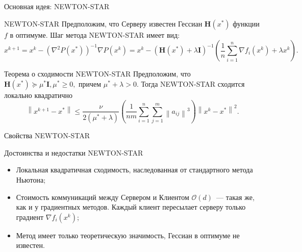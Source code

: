 \documentclass[aspectratio=169,xcolor=dvipsnames]{beamer}
\newcommand{\norm}[1]{\left\|#1\right\|}
\newcommand{\mH}{\mathbf{H}}
\newcommand{\mI}{\mathbf{I}}
\begin{document}
\begin{frame}{Основная идея: {\sf NEWTON-STAR}}
    \begin{block}{NEWTON-STAR}
        Предположим, что Серверу известен Гессиан $\mH(x^*)$ функции $f$ в оптимуме. Шаг метода NEWTON-STAR имеет вид:
        \begin{equation}
            x^{k+1} = x^k - \left(\nabla^2P(x^*)\right)^{-1}\nabla P(x^k) = x^k - \left(\mH(x^*)+\lambda\mI\right)^{-1}\left(\frac{1}{n}\sum\limits_{i=1}^n \nabla f_i(x^k)+\lambda x^k\right).
        \end{equation}
    \end{block}

    \begin{block}{Теорема о сходимости NEWTON-STAR}
        Предположим, что $\mH(x^*) \succeq \mu^*\mI, \mu^* \geq 0,$ причем $\mu^*+\lambda > 0.$ Тогда {\sf NEWTON-STAR} сходится локально квадратично
        \begin{equation}
            \norm{x^{k+1}-x^*} \leq\frac{\nu}{2(\mu^*+\lambda)} \left(\frac{1}{nm}\sum\limits_{i=1}^n\sum\limits_{j=1}^m\norm{a_{ij}}^3\right)\norm{x^k-x^*}^2.
        \end{equation}
    \end{block}
\end{frame}

\begin{frame}{Свойства NEWTON-STAR}
    \begin{block}{Достоинства и недостатки NEWTON-STAR}
        \begin{itemize}
            \item Локальная квадратичная сходимость, наследованная от стандартного метода Ньютона;
            \item Стоимость коммуникаций между Сервером и Клиентом $\mathcal{O}(d)$~--- такая же, как и у градиентных методов. Каждый клиент пересылает серверу только градиент $\nabla f_i(x^k)$;
            \item Метод имеет только теоретическую значимость, Гессиан в оптимуме не известен. 
        \end{itemize}
    \end{block}
\end{frame}
\end{document}
